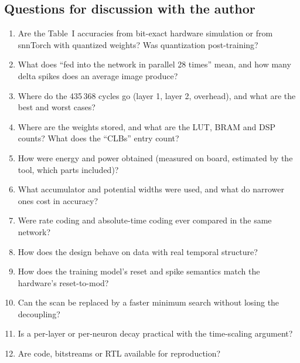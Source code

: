 \subsection{Questions for discussion with the author}
\begin{enumerate}[leftmargin=1.5em]
\item Are the Table~I accuracies from bit-exact hardware simulation or from snnTorch with quantized weights? Was quantization post-training?
\item What does ``fed into the network in parallel 28 times'' mean, and how many delta spikes does an average image produce?
\item Where do the 435\,368 cycles go (layer 1, layer 2, overhead), and what are the best and worst cases?
\item Where are the weights stored, and what are the LUT, BRAM and DSP counts? What does the ``CLBs'' entry count?
\item How were energy and power obtained (measured on board, estimated by the tool, which parts included)?
\item What accumulator and potential widths were used, and what do narrower ones cost in accuracy?
\item Were rate coding and absolute-time coding ever compared in the same network?
\item How does the design behave on data with real temporal structure?
\item How does the training model's reset and spike semantics match the hardware's reset-to-mod?
\item Can the scan be replaced by a faster minimum search without losing the decoupling?
\item Is a per-layer or per-neuron decay practical with the time-scaling argument?
\item Are code, bitstreams or RTL available for reproduction?
\end{enumerate}

